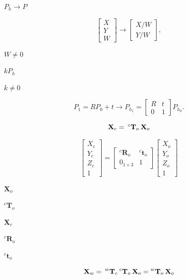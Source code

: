\documentclass{article}
\begin{document}
$P_h \rightarrow P$
\pagebreak

\[\begin{bmatrix}
X \\
Y \\
W
\end{bmatrix} \rightarrow \begin{bmatrix}
X / W \\
Y / W
\end{bmatrix},\]
\pagebreak

$W \ne 0$
\pagebreak

$k P_h$
\pagebreak

$k \ne 0$
\pagebreak

\[P_1 = R P_0 + t \rightarrow P_{h_1} = \begin{bmatrix}
R & t \\
0 & 1
\end{bmatrix} P_{h_0}.\]
\pagebreak

\[\mathbf{X}_c = \hspace{0.2em}
{}^{c}\mathbf{T}_o \hspace{0.2em} \mathbf{X}_o
\]
\pagebreak

\[\begin{bmatrix}
X_c \\
Y_c \\
Z_c \\
1
\end{bmatrix} =
\begin{bmatrix}
{}^{c}\mathbf{R}_o & {}^{c}\mathbf{t}_o \\
0_{1 \times 3} & 1
\end{bmatrix}
\begin{bmatrix}
X_o \\
Y_o \\
Z_o \\
1
\end{bmatrix}
\]
\pagebreak

$ \mathbf{X}_o $
\pagebreak

$ {}^{c}\mathbf{T}_o $
\pagebreak

$ \mathbf{X}_c $
\pagebreak

$ {}^{c}\mathbf{R}_o $
\pagebreak

$ {}^{c}\mathbf{t}_o $
\pagebreak

\[\mathbf{X}_w = \hspace{0.2em}
{}^{w}\mathbf{T}_c \hspace{0.2em} {}^{c}\mathbf{T}_o \hspace{0.2em}
\mathbf{X}_o =
{}^{w}\mathbf{T}_o \hspace{0.2em} \mathbf{X}_o
\]
\pagebreak
\end{document}
